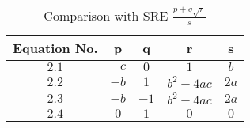 \begin{table}[htb]
	\caption{Comparison with SRE $\frac{p+q\sqrt{r}}{s}$}
	\label{tab:nameOfTheTable}
	\bigskip %
	\begin{center}
		\begin{tabular}{|c|c|c|c|c|}
			\hline
			Equation No.& p & q & r & s \\
			\hline \hline
			$2.1$ & $-c$ & $0$ & $1$ & $b$ \\
			\hline
			$2.2$ & $-b$ & $1$ & $b^{2}-4ac$ & $2a$ \\
			\hline
			$2.3$ & $-b$ & $-1$ & $b^{2}-4ac$ & $2a$ \\
			\hline
			$2.4$ & $0$ & $1$ & $0$ & $0$ \\
			\hline
		\end{tabular}
	\end{center}
\end{table}
